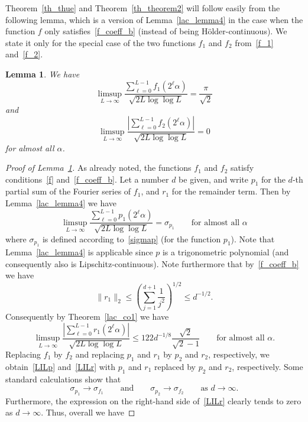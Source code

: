 \documentclass[12pt]{amsart}
\newtheorem{lemma}{Lemma}
\begin{document}
Theorem~\ref{th_thue} and Theorem~\ref{th_theorem2} will follow easily from the following lemma, which is a version of Lemma~\ref{lac_lemma4} in the case when the function $f$ only satisfies~\eqref{f_coeff_b} (instead of being H\"older-continuous). We state it only for the special case of the two functions $f_1$ and $f_2$ from~\eqref{f_1} and~\eqref{f_2}.

\begin{lemma} \label{lemmath1}
We have
$$
\limsup_{L \to \infty} \frac{\sum_{\ell=0}^{L-1} f_1(2^\ell \alpha)}{\sqrt{2 L \log \log L}} = \frac{\pi}{\sqrt{2}}
$$
and
$$
\limsup_{L \to \infty} \frac{\left|  \sum_{\ell=0}^{L-1} f_2(2^\ell \alpha)\right|}{\sqrt{2 L \log \log L}} = 0
$$
for almost all $\alpha$.
\end{lemma}

\begin{proof}[Proof of Lemma~\ref{lemmath1}]
As already noted, the functions $f_1$ and $f_2$ satisfy conditions~\eqref{f} and~\eqref{f_coeff_b}. Let a number $d$ be given, and write $p_1$ for the $d$-th partial sum of the Fourier series of $f_1$, and $r_1$ for the remainder term. Then by Lemma~\ref{lac_lemma4} we have
\begin{equation} \label{LILp}
\limsup_{L \to \infty} \frac{\sum_{\ell=0}^{L-1} p_1(2^\ell \alpha)}{\sqrt{2 L \log \log L}} = \sigma_{p_1} \qquad \textrm{for almost all $\alpha$}
\end{equation}
where $\sigma_{p_1}$ is defined according to~\eqref{sigmap} (for the function $p_1$). Note that Lemma~\ref{lac_lemma4} is applicable since $p$ is a trigonometric polynomial (and consequently also is Lipschitz-continuous). Note furthermore that by~\eqref{f_coeff_b} we have
$$
\|r_1\|_2 \leq \left( \sum_{j=1}^{d+1} \frac{1}{j^2} \right)^{1/2} \leq d^{-1/2}.
$$
Consequently by Theorem~\ref{lac_co1} we have
\begin{equation} \label{LILr}
\limsup_{L \to \infty} \frac{\left| \sum_{\ell=0}^{L-1} r_1(2^\ell \alpha) \right|}{\sqrt{2 L \log \log L}} \leq 122 d^{-1/8} \frac{\sqrt{2}}{\sqrt{2}-1}  \qquad \textrm{for almost all $\alpha$}.
\end{equation}
Replacing $f_1$ by $f_2$ and replacing $p_1$ and $r_1$ by $p_2$ and $r_2$, respectively, we obtain~\eqref{LILp} and~\eqref{LILr} with $p_1$ and $r_1$ replaced by $p_2$ and $r_2$, respectively. Some standard calculations show that 
$$
\sigma_{p_1} \to \sigma_{f_1} \qquad \textrm{and} \qquad \sigma_{p_2} \to \sigma_{f_2} \qquad \textrm{as $d \to \infty$}.
$$
Furthermore, the expression on the right-hand side of~\eqref{LILr} clearly tends to zero as $d \to \infty$. Thus, overall we have

\end{proof}
\end{document}
